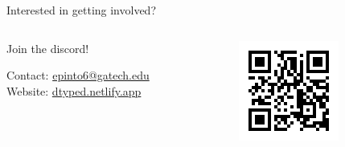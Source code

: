 \documentclass{beamer}
\begin{document}
\begin{frame}{Interested in getting involved?}
  \begin{columns}
    \begin{column}{0.5\textwidth}
      \centering
      Join the discord! \\
      \vspace{1cm}
      \begin{flushleft}
        Contact: \href{mailto://epinto6@gatech.edu}{epinto6@gatech.edu} \\
        Website: \href{https://dtyped.netlify.app}{dtyped.netlify.app}
      \end{flushleft}
    \end{column}
    \begin{column}{0.3\textwidth}
      \centering
      \includegraphics[width=\textwidth]{assets/join-discord-qr.png}
    \end{column}
  \end{columns}
\end{frame}
\end{document}
